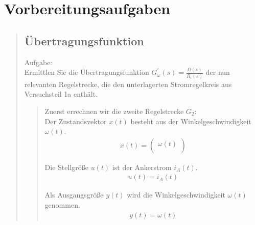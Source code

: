 \section{Vorbereitungsaufgaben}
\begin{quote}
	\hspace{-2em}
	\subsection{Übertragungsfunktion}
    Aufgabe:\\
    Ermittlen Sie die Übertragungsfunktion $G_\omega^{'} (s) = \frac{\Omega(s)}{R_i (s)}$ der nun relevanten
    Regelstrecke, die den unterlagerten Stromregelkreis aus Versuchsteil 1a enthält.\\
	\begin{quote}
	   Zuerst errechnen wir die zweite Regelstrecke $G_2$:\\
	   Der Zustandsvektor $x(t)$ besteht aus der Winkelgeschwindigkeit $\omega(t)$.
        \begin{equation*}
            \begin{split}
                x(t) = 
                    \begin {pmatrix}
                        \omega(t)\\
                    \end{pmatrix}
            \end{split}
        \end{equation*}
        
        Die Stellgröße $u(t)$ ist der Ankerstrom $i_A(t)$.
        \begin{equation*}
            \begin{split}
                u(t) = i_A (t)
            \end{split}
        \end{equation*}
        
        Als Ausgangsgröße $y(t)$ wird die Winkelgeschwindigkeit $\omega(t)$ genommen.
        \begin{equation*}
            \begin{split}
                y(t) = \omega(t)
            \end{split}
        \end{equation*}
        

\end{quote}
\end{quote}
